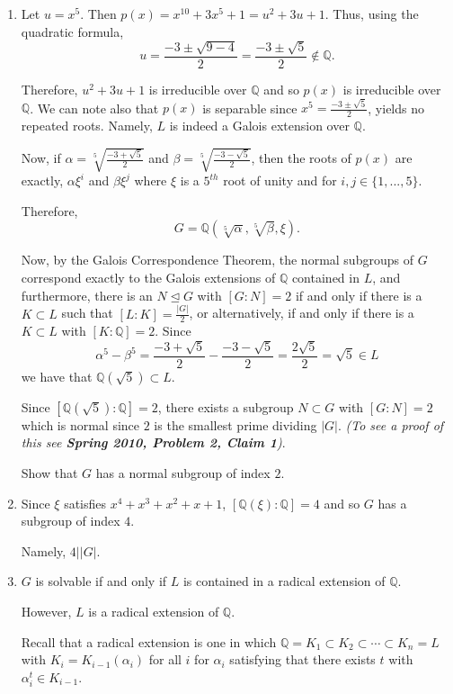 \documentclass[12pt]{Qual}
\begin{document}
\begin{solution}$\,$
\begin{enumerate}[label=(\alph*)]
    \item Let $u=x^5$. Then $p(x)=x^{10}+3x^5+1=u^2+3u+1.$ Thus, using the quadratic formula, $$u=\frac{-3\pm\sqrt{9-4}}{2}=\frac{-3\pm\sqrt{5}}{2}\notin\mathbb{Q}.$$

    Therefore, $u^2+3u+1$ is irreducible over $\mathbb{Q}$ and so $p(x)$ is irreducible over $\mathbb{Q}$. We can note also that $p(x)$ is separable since $x^5=\frac{-3\pm\sqrt{5}}{2}$, yields no repeated roots. Namely, $L$ is indeed a Galois extension over $\mathbb{Q}$.

    Now, if $\alpha=\sqrt[5]{\frac{-3+\sqrt{5}}{2}}$ and $\beta=\sqrt[5]{\frac{-3-\sqrt{5}}{2}}$, then the roots of $p(x)$ are exactly, $\alpha\xi^i$ and $\beta\xi^j$ where $\xi$ is a $5^{th}$ root of unity and for $i,j\in\{1,...,5\}$.

    Therefore, $$G=\mathbb{Q}(\sqrt[5]{\alpha},\sqrt[5]{\beta},\xi).$$

    Now, by the Galois Correspondence Theorem, the normal subgroups of $G$ correspond exactly to the Galois extensions of $\mathbb{Q}$ contained in $L$, and furthermore, there is an $N\trianglelefteq G$ with $[G:N]=2$ if and only if there is a $K\subset L$ such that $[L:K]=\frac{|G|}{2}$, or alternatively, if and only if there is a $K\subset L$ with $[K:\mathbb{Q}]=2.$ Since $$\alpha^5-\beta^5=\frac{-3+\sqrt{5}}{2}-\frac{-3-\sqrt{5}}{2}=\frac{2\sqrt{5}}{2}=\sqrt{5}\in L$$ we have that $\mathbb{Q}(\sqrt{5})\subset L$.

    Since $[\mathbb{Q}(\sqrt{5}):\mathbb{Q}]=2$, there exists a subgroup $N\subset G$ with $[G:N]=2$ which is normal since $2$ is the smallest prime dividing $|G|.$ \textit{(To see a proof of this see \textbf{Spring 2010, Problem 2, Claim 1})}.

    Show that $G$ has a normal subgroup of index $2$.
    \item Since $\xi$ satisfies $x^4+x^3+x^2+x+1$, $[\mathbb{Q}(\xi):\mathbb{Q}]=4$ and so $G$ has a subgroup of index $4.$

    Namely, $4||G|.$

    \item $G$ is solvable if and only if $L$ is contained in a radical extension of $\mathbb{Q}$.

    However, $L$ is a radical extension of $\mathbb{Q}$.

    Recall that a radical extension is one in which $\mathbb{Q}=K_1\subset K_2\subset\cdots\subset K_n=L$ with $K_i=K_{i-1}(\alpha_i)$ for all $i$ for $\alpha_i$ satisfying that there exists $t$ with $\alpha_i^t\in K_{i-1}$.


\end{enumerate}
\end{solution}
\end{document}
